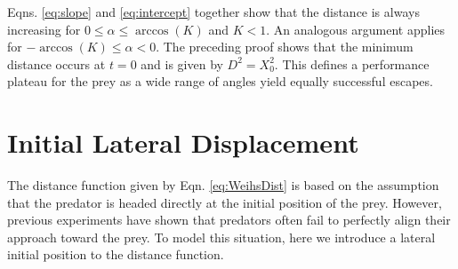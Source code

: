 \documentclass[12pt]{article}
\begin{document}
%
Eqns. \ref{eq:slope} and  \ref{eq:intercept} together show that the distance is always increasing for $0\leq \alpha \leq \arccos (K)$ and $K<1.$ 
An analogous argument applies for $-\arccos(K) \leq \alpha < 0.$ The preceding proof shows that the minimum distance occurs at $t=0$ and is given by $D^2 = X_0^2.$ This defines a performance plateau for the prey as a wide range of angles yield equally successful escapes. 



\section{Initial Lateral Displacement}
The distance function given by Eqn. \ref{eq:WeihsDist} is based on the assumption that the predator is headed directly at the initial position of the prey. 
However, previous experiments have shown that predators often fail to perfectly align their approach toward the prey.
To model this situation, here we introduce a lateral initial position to the distance function. 
\end{document}
